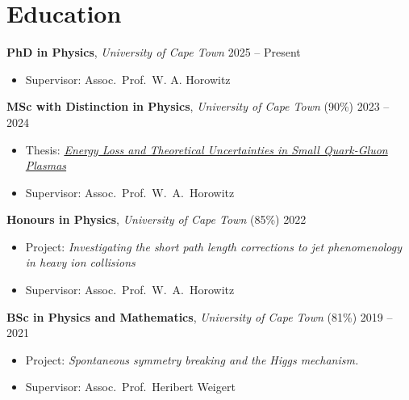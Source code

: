 \documentclass[11pt,letter,sans]{moderncv}
\begin{document}
\nocite{*}
\makecvtitle
\vspace{-1cm}

\section{Education}
    \textbf{PhD in Physics}, \emph{University of Cape Town}
    \hfill 2025 -- Present \par
  \begin{itemize}
      \item Supervisor: Assoc.\ Prof.\ W. A. Horowitz
  \end{itemize}
  \vspace{3mm}
    \textbf{MSc with Distinction in Physics}, \emph{University of Cape Town}
        (90\%)
    \hfill 2023 -- 2024 \par
  \begin{itemize}
      \item Thesis: \href{https://inspirehep.net/literature/2928736}{\textit{Energy Loss and Theoretical Uncertainties in Small Quark-Gluon Plasmas}} \par
      \item Supervisor: Assoc.\ Prof.\ W.\ A.\ Horowitz
  \end{itemize}
  \vspace{3mm}
    \textbf{Honours in Physics}, \emph{University of Cape Town}
        (85\%)
    \hfill 2022 \par
  \begin{itemize}
      \item Project: \textit{Investigating the short path length corrections to jet phenomenology in heavy ion collisions}
      \item Supervisor: Assoc.\ Prof.\ W.\ A.\ Horowitz
  \end{itemize}
  \vspace{3mm}
    \textbf{BSc in Physics and Mathematics}, \emph{University of Cape Town}
        (81\%)
    \hfill 2019 -- 2021 \par
  \begin{itemize}
      \item Project: \textit{Spontaneous symmetry breaking and the Higgs mechanism.}
      \item Supervisor: Assoc.\ Prof.\ Heribert Weigert
  \end{itemize}
  \vspace{3mm}
\vspace{-3mm}
\end{document}
